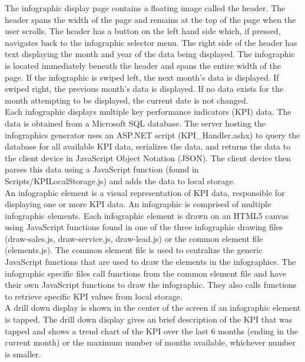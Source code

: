 \documentclass[11pt,a4paper,oneside]{article}
\begin{document}
The infographic display page contains a floating image called the header.  The header spans the width of the page and remains at the top of the page when the user scrolls.  The header has a button on the left hand side which, if pressed, navigates back to the infographic selector menu.  The right side of the header has text displaying the month and year of the data being displayed.  The infographic is located immediately beneath the header and spans the entire width of the page.  If the infographic is swiped left, the next month's data is displayed.  If swiped right, the previous month's data is displayed.  If no data exists for the month attempting to be displayed, the current date is not changed.\\


Each infographic displays multiple key performance indicators (KPI) data. The data is obtained from a Microsoft SQL database. The server hosting the infographics generator uses an ASP.NET script (KPI\_Handler.ashx) to query the database for all available KPI data, serializes the data, and returns the data to the client device in JavaScript Object Notation (JSON).  The client device then parses this data using a JavaScript function (found in Scripts/KPILocalStorage.js) and adds the data to local storage.\\


An infographic element is a visual representation of KPI data, responsible for displaying one or more KPI data. An infographic is comprised of multiple infographic elements. Each infographic element is drawn on an HTML5 canvas using JavaScript functions found in one of the three infographic drawing files (draw-sales.js, draw-service.js, draw-lead.js) or the common element file (elements.js). The common element file is used to centralize the generic JavaScript functions that are used to draw the elements in the infographics. The infographic specific files call functions from the common element file and have their own JavaScript functions to draw the infographic. They also calls functions to retrieve specific KPI values from local storage.\\


A drill down display is shown in the center of the screen if an infographic element is tapped.  The drill down display gives an brief description of the KPI that was tapped and shows a trend chart of the KPI over the last 6 months (ending in the current month) or the maximum number of months available, whichever number is smaller.\\
\end{document}
